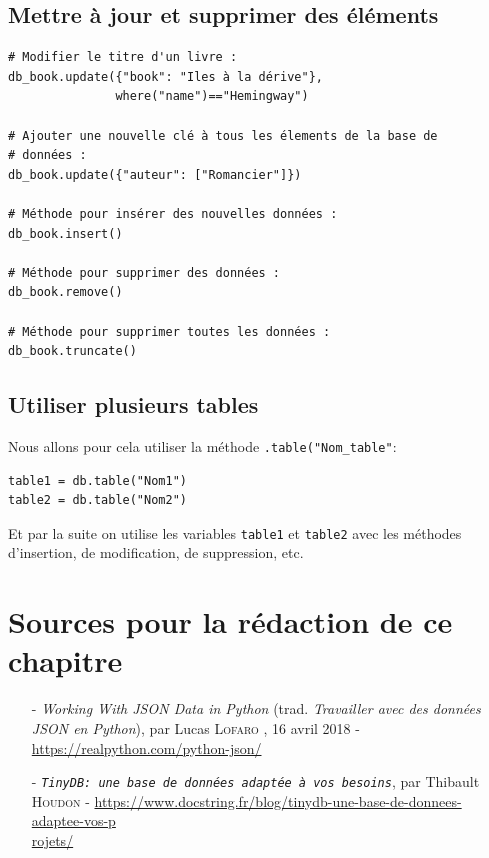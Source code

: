\documentclass[a4paper,12pt]{book}
\begin{document}
\subsection*{Mettre à jour et supprimer des éléments}
\begin{lstlisting}[caption=Modifier la base de données]
# Modifier le titre d'un livre :
db_book.update({"book": "Iles à la dérive"},
               where("name")=="Hemingway")

# Ajouter une nouvelle clé à tous les élements de la base de 
# données :
db_book.update({"auteur": ["Romancier"]})

# Méthode pour insérer des nouvelles données :
db_book.insert()

# Méthode pour supprimer des données :
db_book.remove()

# Méthode pour supprimer toutes les données :
db_book.truncate()
\end{lstlisting}
\medskip

\subsection*{Utiliser plusieurs tables}
Nous allons pour cela utiliser la méthode \texttt{.table("Nom\_table"}:
\begin{lstlisting}[caption=Créer plusieurs tables]
table1 = db.table("Nom1")
table2 = db.table("Nom2")
\end{lstlisting}
\medskip

Et par la suite on utilise les variables \texttt{table1} et \texttt{table2} avec les méthodes d'insertion, de modification, de suppression, etc.
\medskip

\section*{Sources pour la rédaction de ce chapitre}
\begin{itemize}
	\item[-] \textit{Working With JSON Data in Python} (trad. \textit{Travailler avec des données JSON en Python}), par Lucas \textsc{Lofaro }, 16 avril 2018 - \url{https://realpython.com/python-json/}
	\item[-] \textit{\texttt{TinyDB: une base de données adaptée à vos besoins}}, par Thibault \textsc{Houdon} - \url{https://www.docstring.fr/blog/tinydb-une-base-de-donnees-adaptee-vos-p}\\\url{rojets/}
\end{itemize}
\medskip
\end{document}
